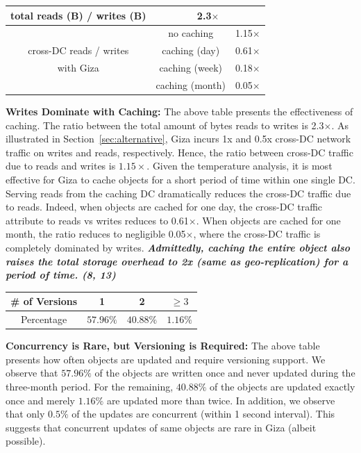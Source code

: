 \begin{table}[h]
\footnotesize
\centering
\begin{tabular}{|c||c|c|}
\hline \hline
total reads (B) / writes (B) 	& \multicolumn{2}{c|}{2.3$\times$}
\\ \hline \hline
	& no caching		& 1.15$\times$
\\ \cline{2-3}
cross-DC reads / writes
	& caching (day)		& 0.61$\times$ 
\\ \cline{2-3}
with Giza
	& caching (week)	& 0.18$\times$ 
\\ \cline{2-3}
	& caching (month)	& 0.05$\times$ 
\\ \hline \hline
\end{tabular}
\label{tab:caching}
\end{table}
{\bf Writes Dominate with Caching:} The above table presents the effectiveness of caching. The ratio between the total amount of bytes reads to writes is 2.3$\times$. 
As illustrated in Section~\ref{sec:alternative}, Giza incurs 1x and 0.5x cross-DC network traffic on writes and reads, respectively. Hence, the ratio between cross-DC traffic due to reads and writes is $1.15\times$. Given the temperature analysis, it is most effective for Giza to cache objects for a short period of time within one single DC. Serving reads from the caching DC dramatically reduces the cross-DC traffic due to reads. Indeed, when objects are cached for one day, the cross-DC traffic attribute to reads vs writes reduces to 0.61$\times$. When objects are cached for one month, the ratio reduces to negligible 0.05$\times$, where the cross-DC traffic is completely dominated by writes. \textit{\textbf{Admittedly, caching the entire object also raises the total storage overhead to 2x (same as geo-replication) for a period of time. (8, 13)}}

\begin{table}[h]
\footnotesize
\centering
\begin{tabular}{c||c|c|c}
\# of Versions 	& 	1				& 2					& $\ge 3$
\\ \hline
Percentage			& $57.96\%$	& $40.88\%$	& $1.16\%$
\end{tabular}
\label{tab:version}
\end{table}
{\bf Concurrency is Rare, but Versioning is Required:} The above table presents how often objects are updated and require versioning support. We observe that $57.96\%$ of the objects are written once and never updated during the three-month period. For the remaining, $40.88\%$ of the objects are updated exactly once and merely $1.16\%$ are updated more than twice. In addition, we observe that only $0.5\%$ of the updates
are concurrent (within 1 second interval). This suggests that concurrent updates of same objects are rare in Giza (albeit possible).

